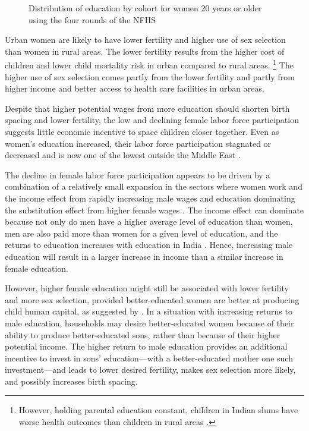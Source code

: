 \documentclass[12pt,letterpaper]{article}
\begin{document}
\begin{figure}[htpb]
\centering
{} 
\caption{Distribution of education by cohort for women 20 years or older
using the four rounds of the NFHS}
\label{fig:education_over_time}
\end{figure}

Urban women are likely to have lower fertility and higher use of sex selection than women 
in rural areas.
The lower fertility results from the higher cost of children and lower child mortality 
risk in urban compared to rural areas.%
\footnote{
However, holding parental education constant, children in Indian slums have worse
health outcomes than children in rural areas \citep{Portner2018a}.
}
The higher use of sex selection comes partly from the lower fertility and partly from
higher income and better access to health care facilities in urban areas.

Despite that higher potential wages from more education should shorten birth spacing and
lower fertility, the low and declining female labor force participation suggests little
economic incentive to space children closer together.
Even as women's education increased, their labor force participation stagnated or 
decreased and is now one of the lowest outside the Middle East 
\citep{Klasen2015,Fletcher2017,Afridi2018,Bhargava2018,Chatterjee2018}.

The decline in female labor force participation appears to be driven by a combination
of a relatively small expansion in the sectors where women work and the income effect 
from rapidly increasing male wages and education dominating the substitution effect from 
higher female wages \citep{Klasen2015,Bhargava2018}.
The income effect can dominate because not only do men have a higher average level of 
education than women, men are also paid more than women for a given level of education, 
and the returns to education increases with education in India \citep{Agrawal2011}.
Hence, increasing male education will result in a larger increase in income than a 
similar increase in female education.


However, higher female education might still be associated with lower fertility and more 
sex selection, provided better-educated women are better at producing child human capital, 
as suggested by \citet{Behrman1999}. 
In a situation with increasing returns to male education, households may desire 
better-educated women because of their ability to produce better-educated sons, 
rather than because of their higher potential income. 
The higher return to male education provides an additional incentive to invest in sons' 
education---with a better-educated mother one such investment---and leads to lower desired 
fertility, makes sex selection more likely, and possibly increases birth spacing.
\end{document}
